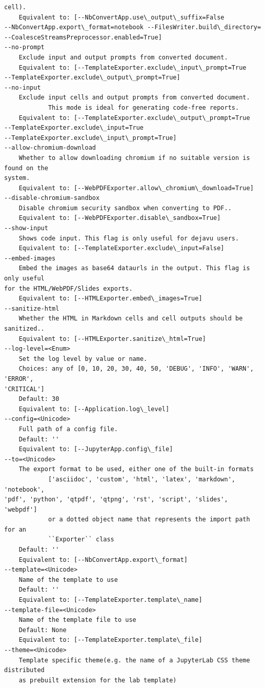 \documentclass[11pt]{article}
\begin{document}
\begin{Verbatim}[commandchars=\\\{\}]
cell).
    Equivalent to: [--NbConvertApp.use\_output\_suffix=False
--NbConvertApp.export\_format=notebook --FilesWriter.build\_directory=
--CoalesceStreamsPreprocessor.enabled=True]
--no-prompt
    Exclude input and output prompts from converted document.
    Equivalent to: [--TemplateExporter.exclude\_input\_prompt=True
--TemplateExporter.exclude\_output\_prompt=True]
--no-input
    Exclude input cells and output prompts from converted document.
            This mode is ideal for generating code-free reports.
    Equivalent to: [--TemplateExporter.exclude\_output\_prompt=True
--TemplateExporter.exclude\_input=True
--TemplateExporter.exclude\_input\_prompt=True]
--allow-chromium-download
    Whether to allow downloading chromium if no suitable version is found on the
system.
    Equivalent to: [--WebPDFExporter.allow\_chromium\_download=True]
--disable-chromium-sandbox
    Disable chromium security sandbox when converting to PDF..
    Equivalent to: [--WebPDFExporter.disable\_sandbox=True]
--show-input
    Shows code input. This flag is only useful for dejavu users.
    Equivalent to: [--TemplateExporter.exclude\_input=False]
--embed-images
    Embed the images as base64 dataurls in the output. This flag is only useful
for the HTML/WebPDF/Slides exports.
    Equivalent to: [--HTMLExporter.embed\_images=True]
--sanitize-html
    Whether the HTML in Markdown cells and cell outputs should be sanitized..
    Equivalent to: [--HTMLExporter.sanitize\_html=True]
--log-level=<Enum>
    Set the log level by value or name.
    Choices: any of [0, 10, 20, 30, 40, 50, 'DEBUG', 'INFO', 'WARN', 'ERROR',
'CRITICAL']
    Default: 30
    Equivalent to: [--Application.log\_level]
--config=<Unicode>
    Full path of a config file.
    Default: ''
    Equivalent to: [--JupyterApp.config\_file]
--to=<Unicode>
    The export format to be used, either one of the built-in formats
            ['asciidoc', 'custom', 'html', 'latex', 'markdown', 'notebook',
'pdf', 'python', 'qtpdf', 'qtpng', 'rst', 'script', 'slides', 'webpdf']
            or a dotted object name that represents the import path for an
            ``Exporter`` class
    Default: ''
    Equivalent to: [--NbConvertApp.export\_format]
--template=<Unicode>
    Name of the template to use
    Default: ''
    Equivalent to: [--TemplateExporter.template\_name]
--template-file=<Unicode>
    Name of the template file to use
    Default: None
    Equivalent to: [--TemplateExporter.template\_file]
--theme=<Unicode>
    Template specific theme(e.g. the name of a JupyterLab CSS theme distributed
    as prebuilt extension for the lab template)

\end{Verbatim}
\end{document}
